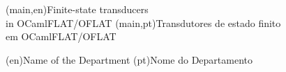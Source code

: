 
%




%
%
%
%
\nttitle(main,en){Finite-state transducers\\in OCamlFLAT/OFLAT}%
\nttitle(main,pt){Transdutores de estado finito\\em OCamlFLAT/OFLAT}%




%
%
%
%
\ntdepartment*(en){Name of the Department} %
\ntdepartment*(pt){Nome do Departamento}   %



